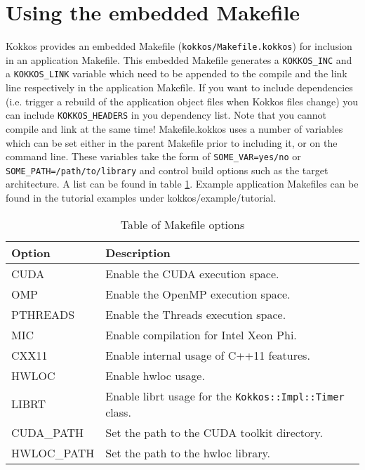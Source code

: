 \section{Using the embedded Makefile}

Kokkos provides an embedded Makefile (\lstinline|kokkos/Makefile.kokkos|) for inclusion in an application Makefile. 
This embedded Makefile generates a \lstinline|KOKKOS_INC| and a \lstinline|KOKKOS_LINK| variable which need to be appended to the compile and the link line respectively in the application Makefile. 
If you want to include dependencies (i.e. trigger a rebuild of the application object files when Kokkos files change) you can include \lstinline|KOKKOS_HEADERS| in you dependency list.
Note that you cannot compile and link at the same time!
Makefile.kokkos uses a number of variables which can be set either in the parent Makefile prior to including it, or on the command line.
These variables take the form of \lstinline|SOME_VAR=yes/no| or \lstinline|SOME_PATH=/path/to/library| and control build options such as the target architecture. 
A list can be found in table \ref{TBL:MakefileOptions}.
Example application Makefiles can be found in the tutorial examples under kokkos/example/tutorial.


\begin{table}
\caption{Table of Makefile options}
\label{TBL:MakefileOptions}
\begin{small}
\begin{tabular}[t]{lp{}}
\hline\hline
Option & Description \\
\hline
CUDA & Enable the CUDA execution space. \\
OMP & Enable the OpenMP execution space. \\
PTHREADS & Enable the Threads execution space.\\
MIC & Enable compilation for Intel Xeon Phi. \\
CXX11 & Enable internal usage of C++11 features.\\
HWLOC & Enable hwloc usage.\\
LIBRT & Enable librt usage for the \lstinline|Kokkos::Impl::Timer| class.\\
CUDA\_PATH & Set the path to the CUDA toolkit directory.\\
HWLOC\_PATH & Set the path to the hwloc library.\\
\hline\hline
\end{tabular}
\end{small}
\end{table}

